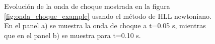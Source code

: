 \documentclass[12pt,a4paper]{book}
\begin{document}
\begin{figure}
\centering
{}
\caption{\label{fig:HLL-prueba1}Evolución de la onda de choque mostrada en la figura \ref{fig:onda_choque_example} usando el método de HLL newtoniano. En el panel a) se muestra la onda de choque a t=0.05 s, mientras que en el panel b) se muestra para t=0.10 s.} 
\end{figure}
\end{document}
